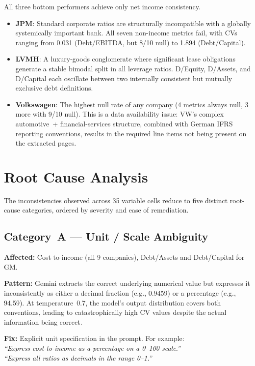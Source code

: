 \documentclass[12pt, a4paper]{article}
\begin{document}
All three bottom performers achieve only net income consistency.
\begin{itemize}
  \item \textbf{JPM}: Standard corporate ratios are structurally incompatible
        with a globally systemically important bank.  All seven non-income
        metrics fail, with CVs ranging from 0.031 (Debt/EBITDA, but 8/10
        null) to 1.894 (Debt/Capital).
  \item \textbf{LVMH}: A luxury-goods conglomerate where significant lease
        obligations generate a stable bimodal split in all leverage ratios.
        D/Equity, D/Assets, and D/Capital each oscillate between two
        internally consistent but mutually exclusive debt definitions.
  \item \textbf{Volkswagen}: The highest null rate of any company (4 metrics
        always null, 3 more with 9/10 null).  This is a data availability
        issue: VW's complex automotive~+ financial-services structure, combined
        with German IFRS reporting conventions, results in the required line
        items not being present on the extracted pages.
\end{itemize}

\section{Root Cause Analysis}
\label{sec:root-causes}

The inconsistencies observed across 35 variable cells reduce to five distinct
root-cause categories, ordered by severity and ease of remediation.

\subsection{Category~A --- Unit / Scale Ambiguity}

\textbf{Affected:} Cost-to-income (all 9 companies), Debt/Assets and
Debt/Capital for GM.

\textbf{Pattern:} Gemini extracts the correct underlying numerical value but
expresses it inconsistently as either a decimal fraction (e.g., 0.9459) or a
percentage (e.g., 94.59).  At temperature~0.7, the model's output distribution
covers both conventions, leading to catastrophically high CV values despite
the actual information being correct.

\textbf{Fix:} Explicit unit specification in the prompt.  For example:\\
\textit{``Express cost-to-income as a percentage on a 0--100 scale.''} \\
\textit{``Express all ratios as decimals in the range 0--1.''}
\end{document}
